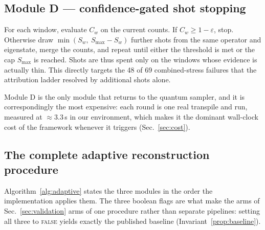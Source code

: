 \documentclass[preprint,11pt]{elsarticle}
\newcommand{\Cw}{C_w}
\newcommand{\Smax}{S_{\max}}
\begin{document}
\subsection{Module D --- confidence-gated shot stopping}
\label{sec:moduleD}

For each window, evaluate $\Cw$ on the current counts. If
$\Cw \ge 1-\varepsilon$, stop. Otherwise draw
$\min(S_w,\ \Smax-S_w)$ further shots from the same operator and
eigenstate, merge the counts, and repeat until either the threshold is
met or the cap $\Smax$ is reached. Shots are thus spent only on the
windows whose evidence is actually thin. This directly targets the 48 of
69 combined-stress failures that the attribution ladder resolved by
additional shots alone.

Module D is the only module that returns to the quantum sampler, and it
is correspondingly the most expensive: each round is one real transpile
and run, measured at ${\approx}3.3$\,s in our environment, which makes it
the dominant wall-clock cost of the framework whenever it triggers
(Sec.~\ref{sec:cost}).

\subsection{The complete adaptive reconstruction procedure}
\label{sec:algorithm}

Algorithm~\ref{alg:adaptive} states the three modules in the order the
implementation applies them. The three boolean flags are what make the
arms of Sec.~\ref{sec:validation} arms of one procedure rather than
separate pipelines: setting all three to \textsc{false} yields exactly
the published baseline (Invariant~\ref{prop:baseline}).
\end{document}
